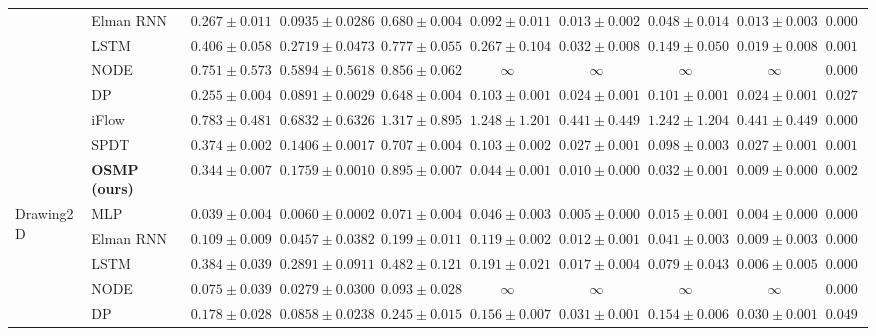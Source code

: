 \begin{table}[htbp]
\begin{tiny}
\begin{tabular}{|l|l|ccc|cc|cc|c|}
    & Elman \gls{RNN} & $0.267 \pm 0.011$ & $0.0935 \pm 0.0286$ & $0.680 \pm 0.004$ & $0.092 \pm 0.011$ & $0.013 \pm 0.002$ & $0.048 \pm 0.014$ & $0.013 \pm 0.003$ & $0.0009$\\
    & \gls{LSTM} & $0.406 \pm 0.058$ & $0.2719 \pm 0.0473$ & $0.777 \pm 0.055$ & $0.267 \pm 0.104$ & $0.032 \pm 0.008$ & $0.149 \pm 0.050$ & $0.019 \pm 0.008$ & $0.0010$\\
    & \gls{NODE} & $0.751 \pm 0.573$ & $0.5894 \pm 0.5618$ & $0.856 \pm 0.062$ & $\infty$ & $\infty$ & $\infty$ & $\infty$ & $0.0009$\\
    & \gls{DP} & $\mathbf{0.255 \pm 0.004}$ & $\mathbf{0.0891 \pm 0.0029}$ & $\mathbf{0.648 \pm 0.004}$ & $0.103 \pm 0.001$ & $0.024 \pm 0.001$ & $0.101 \pm 0.001$ & $0.024 \pm 0.001$ & $0.0272$\\
    & iFlow & $0.783 \pm 0.481$ & $0.6832 \pm 0.6326$ & $1.317 \pm 0.895$ & $1.248 \pm 1.201$ & $0.441 \pm 0.449$ & $1.242 \pm 1.204$ & $0.441 \pm 0.449$ & $\mathbf{0.0007}$\\
    & \gls{SPDT} & $0.374 \pm 0.002$ & $0.1406 \pm 0.0017$ & $0.707 \pm 0.004$ & $0.103 \pm 0.002$ & $0.027 \pm 0.001$ & $0.098 \pm 0.003$ & $0.027 \pm 0.001$ & $0.0019$\\
    & \textbf{OSMP (ours)} & $0.344 \pm 0.007$ & $0.1759 \pm 0.0010$ & $0.895 \pm 0.007$ & $\mathbf{0.044 \pm 0.001}$ & $\mathbf{0.010 \pm 0.000}$ & $\mathbf{0.032 \pm 0.001}$ & $\mathbf{0.009 \pm 0.000}$ & $0.0020$\\
    \midrule
    \multirow{8}{*}{Drawing2D} & MLP & $\mathbf{0.039 \pm 0.004}$ &$\mathbf{0.0060 \pm 0.0002}$ & $\mathbf{0.071 \pm 0.004}$ & $0.046 \pm 0.003$ & $\mathbf{0.005 \pm 0.000}$ & $\mathbf{0.015 \pm 0.001}$ & $\mathbf{0.004 \pm 0.000}$ & $0.0008$\\
    & Elman \gls{RNN} & $0.109 \pm 0.009$ & $0.0457 \pm 0.0382$ & $0.199 \pm 0.011$ & $0.119 \pm 0.002$ & $0.012 \pm 0.001$ & $0.041 \pm 0.003$ & $0.009 \pm 0.003$ & $0.0007$\\
    & \gls{LSTM} & $0.384 \pm 0.039$ & $0.2891 \pm 0.0911$ & $0.482 \pm 0.121$ & $0.191 \pm 0.021$ & $0.017 \pm 0.004$ & $0.079 \pm 0.043$ & $0.006 \pm 0.005$ & $0.0008$\\
    & \gls{NODE} & $0.075 \pm 0.039$ & $0.0279 \pm 0.0300$ & $0.093 \pm 0.028$ & $\infty$ & $\infty$ & $\infty$ & $\infty$ & $0.0008$\\
    & \gls{DP} & $0.178 \pm 0.028$ & $0.0858 \pm 0.0238$ & $0.245 \pm 0.015$ & $0.156 \pm 0.007$ & $0.031 \pm 0.001$ & $0.154 \pm 0.006$ & $0.030 \pm 0.001$ & $0.0494$\\

\end{tabular}
\end{tiny}
\end{table}

